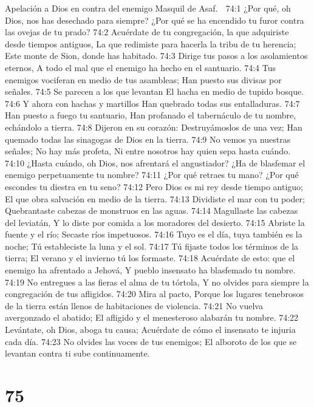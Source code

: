 Apelación a Dios en contra del enemigo 
Masquil de Asaf. 

74:1 ¿Por qué, oh Dios, nos has desechado para siempre? 
¿Por qué se ha encendido tu furor contra las ovejas de tu prado? 
74:2 Acuérdate de tu congregación, la que adquiriste desde tiempos antiguos, 
La que redimiste para hacerla la tribu de tu herencia; 
Este monte de Sion, donde has habitado. 
74:3 Dirige tus pasos a los asolamientos eternos, 
A todo el mal que el enemigo ha hecho en el santuario. 
74:4 Tus enemigos vociferan en medio de tus asambleas; 
Han puesto sus divisas por señales. 
74:5 Se parecen a los que levantan 
El hacha en medio de tupido bosque. 
74:6 Y ahora con hachas y martillos 
Han quebrado todas sus entalladuras. 
74:7 Han puesto a fuego tu santuario, 
Han profanado el tabernáculo de tu nombre, echándolo a tierra. 
74:8 Dijeron en su corazón: Destruyámoslos de una vez; 
Han quemado todas las sinagogas de Dios en la tierra. 
74:9 No vemos ya nuestras señales; 
No hay más profeta, 
Ni entre nosotros hay quien sepa hasta cuándo. 
74:10 ¿Hasta cuándo, oh Dios, nos afrentará el angustiador? 
¿Ha de blasfemar el enemigo perpetuamente tu nombre? 
74:11 ¿Por qué retraes tu mano? 
¿Por qué escondes tu diestra en tu seno? 
74:12 Pero Dios es mi rey desde tiempo antiguo; 
El que obra salvación en medio de la tierra. 
74:13 Dividiste el mar con tu poder; 
Quebrantaste cabezas de monstruos en las aguas. 
74:14 Magullaste las cabezas del leviatán, 
Y lo diste por comida a los moradores del desierto. 
74:15 Abriste la fuente y el río; 
Secaste ríos impetuosos. 
74:16 Tuyo es el día, tuya también es la noche; 
Tú estableciste la luna y el sol. 
74:17 Tú fijaste todos los términos de la tierra; 
El verano y el invierno tú los formaste. 
74:18 Acuérdate de esto: que el enemigo ha afrentado a Jehová, 
Y pueblo insensato ha blasfemado tu nombre. 
74:19 No entregues a las fieras el alma de tu tórtola, 
Y no olvides para siempre la congregación de tus afligidos. 
74:20 Mira al pacto, 
Porque los lugares tenebrosos de la tierra están llenos de habitaciones de violencia. 
74:21 No vuelva avergonzado el abatido; 
El afligido y el menesteroso alabarán tu nombre. 
74:22 Levántate, oh Dios, aboga tu causa; 
Acuérdate de cómo el insensato te injuria cada día. 
74:23 No olvides las voces de tus enemigos; 
El alboroto de los que se levantan contra ti sube continuamente. 

\chapter{75}

